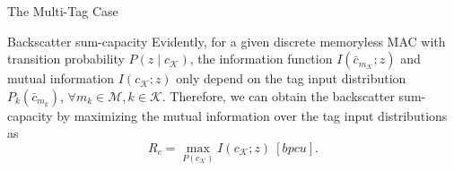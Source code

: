 \documentclass[journal]{IEEEtran}
\begin{document}
\begin{section}{The Multi-Tag Case}
\begin{subsection}{Backscatter sum-capacity}
			Evidently, for a given discrete memoryless MAC with transition probability $P(z \mid c_{\mathcal{K}})$, the information function $I(\bar{c}_{m_{\mathcal{K}}} ; z)$ and mutual information $I(c_{\mathcal{K}} ; z)$ only depend on the tag input distribution $P_k(\bar{c}_{m_k})$, $\forall m_k \in \mathcal{M}, k \in \mathcal{K}$. Therefore, we can obtain the backscatter sum-capacity by maximizing the mutual information over the tag input distributions as
			\begin{equation}
				R_c = \max_{P(c_{\mathcal{K}})} I(c_{\mathcal{K}} ; z) \ [\si{bpcu}].
			\end{equation}









\end{subsection}
\end{section}
\end{document}
